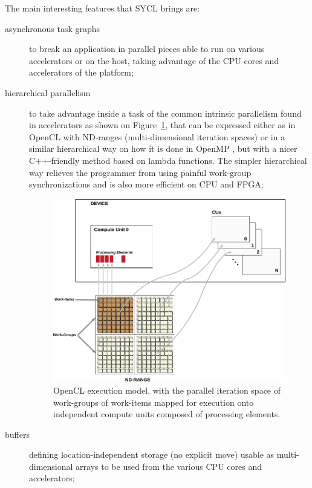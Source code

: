 \documentclass[sigplan, review]{acmart}
\begin{document}
The main interesting features that SYCL brings are:
\begin{description}

\item[asynchronous task graphs] to break an application in parallel
  pieces able to run on various accelerators or on the host, taking
  advantage of the CPU cores and accelerators of the platform;

\item[hierarchical parallelism] to take advantage inside a task of the
  common intrinsic parallelism found in accelerators as shown on
  Figure~\ref{fig:OpenCL-execution-model}, that can be expressed
  either as in OpenCL with ND-ranges (multi-dimensional iteration
  spaces) or in a similar hierarchical way on how it is done in OpenMP
  \cite{OpenMP-5.0-preview-1}, but with a nicer C++-friendly method
  based on lambda functions. The simpler hierarchical way relieves the
  programmer from using painful work-group synchronizations and is
  also more efficient on CPU and FPGA;

  \begin{figure}
    \includegraphics[width=\hsize]{figures/execution-model-no_GPU}
    \caption{OpenCL execution model, with the parallel iteration space
      of work-groups of work-items mapped for execution onto independent
    compute units composed of processing elements.}
    \label{fig:OpenCL-execution-model}
  \end{figure}

\item[buffers] defining location-independent storage (no explicit
  move) usable as multi-dimensional arrays to be used from the various
  CPU cores and accelerators;


\end{description}
\end{document}
